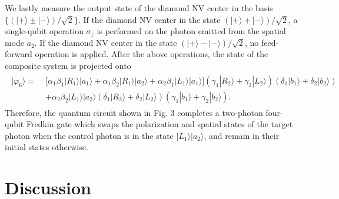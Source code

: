 \documentclass[showpacs,preprintnumbers,showkeys,amsmath,amssymb]{revtex4}%
\begin{document}
 We lastly measure the output state of the diamond NV center in the basis $\{(|+\rangle\pm|-\rangle)/\sqrt{2}\}$. If the diamond NV center in the state $(|+\rangle+|-\rangle)/\sqrt{2}$, a single-qubit operation $\sigma_z$ is performed on the photon emitted from the spatial mode $a_2$. If the diamond NV center in the state $(|+\rangle-|-\rangle)/\sqrt{2}$, no feed-forward operation is applied. After the above operations, the state of the composite system is projected onto
\begin{eqnarray}       \label{eq18}
\begin{split}
|\varphi_6\rangle=\;&
\big[\alpha_{1}\beta_{1}|R_1\rangle|a_1\rangle+\alpha_{1}\beta_{2}|R_1\rangle|a_2\rangle+\alpha_{2}\beta_{1}|L_1\rangle|a_1\rangle\big](\gamma_{1}|R_2\rangle+\gamma_{2}|L_2\rangle)(\delta_{1}|b_1\rangle+\delta_{2}|b_2\rangle)\\&
%
+\alpha_{2}\beta_{2}|L_1\rangle|a_2\rangle(\delta_{1}|R_2\rangle+\delta_{2}|L_2\rangle)(\gamma_{1}|b_1\rangle+\gamma_{2}|b_2\rangle).
\end{split}
\end{eqnarray}
%
%
%
Therefore, the quantum circuit shown in Fig. 3 completes a two-photon four-qubit Fredkin gate which swaps the polarization and spatial states of the target photon when the control photon is in the state $|L_1\rangle|a_2\rangle$, and remain in their initial states otherwise.







\section{Discussion}\label{sec3}
\end{document}
